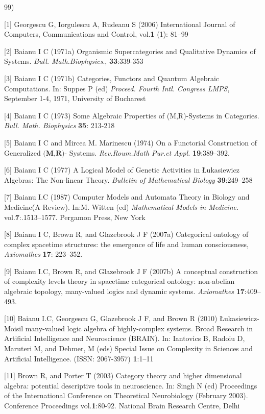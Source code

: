 \documentclass[12pt]{article}
\theoremstyle{plain}
\theoremstyle{definition}
\numberwithin{equation}{section}
\begin{document}
\begin{thebibliography}{99)

[1]
Georgescu G, Iorgulescu A, Rudeanu S (2006) International Journal of Computers, Communications and Control, vol.\textbf{1} (1): 81--99

[2]
Baianu I C (1971a)  Organismic Supercategories and Qualitative Dynamics of Systems. \emph{Bull. Math.Biophysics}., \textbf{33}:339-353

[3]
Baianu I C (1971b) Categories, Functors and Quantum Algebraic Computations. In: Suppes P (ed) \emph{Proceed. Fourth Intl. Congress LMPS}, September 1-4, 1971, University of Bucharest


[4]
Baianu I C  (1973) Some Algebraic Properties of (M,R)-Systems in Categories. \emph{Bull. Math. Biophysics} \textbf{35}: 213-218


[5]
Baianu I C  and Mircea M. Marinescu (1974) On a Functorial Construction of Generalized  $\textbf{(M,R)}$- Systems. \emph{Rev.Roum.Math Pur.et Appl.} \textbf{19}:389--392.

[6]
Baianu I C (1977) A Logical Model of Genetic Activities in \L{}ukasiewicz Algebras: The Non-linear Theory. \emph{Bulletin of Mathematical Biology} \textbf{39}:249--258 

[7]
Baianu I.C (1987) Computer Models and Automata Theory in Biology and Medicine(A Review). In:M. Witten (ed)  \emph{Mathematical Models in Medicine.} vol.\textbf{7}:.1513--1577. Pergamon Press, New York

[8]
Baianu I C, Brown R, and  Glazebrook J F (2007a) Categorical ontology of complex spacetime structures: the emergence of life and human consciousness, \emph{Axiomathes} \textbf{17}: 223--352.

[9]
Baianu I.C, Brown R, and Glazebrook J F  (2007b) A conceptual construction of complexity levels theory in spacetime categorical ontology: non-abelian algebraic topology, many-valued logics and dynamic systems. \emph{Axiomathes} \textbf{17}:409--493.

[10]
Baianu I.C, Georgescu G,  Glazebrook J F, and Brown R (2010)  \L{}ukasiewicz-Moisil many-valued logic algebra of highly-complex systems. Broad Research in Artificial Intelligence and Neuroscience (BRAIN). In: Iantovics B,   Radoiu D, Maruteri M, and Dehmer, M (eds) Special Issue on Complexity in Sciences and Artificial Intelligence.  (ISSN: 2067-3957)  \textbf{1}:1--11
 
[11]
Brown R, and Porter T (2003) Category theory and higher dimensional algebra: potential descriptive tools in neuroscience. In: Singh N (ed) Proceedings of the International Conference on Theoretical Neurobiology (February 2003). Conference Proceedings vol.\textbf{1}:80-92. National Brain Research Centre, Delhi 

}
\end{thebibliography}
\end{document}
